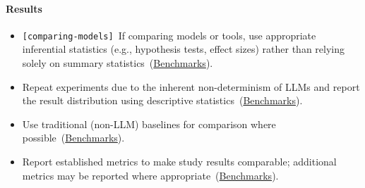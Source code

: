\documentclass[smallextended]{svjour3}
\makeatletter
\newcommand{\must}{\textbf{must}\xspace}
\newcommand{\should}{\textbf{should}\xspace}
\newcommand{\iconM}{\usebox{\iconMbox}\xspace}
\newcommand{\iconS}{\usebox{\iconSbox}\xspace}
\newcommand{\iconM}{●\xspace}
\newcommand{\iconS}{○\xspace}
\newcommand{\condition}[1]{\texttt{\small[#1]}\,}
\newcommand{\condition}[1]{@@cond:#1@@}
\newcommand{\refbenchmarks}{\hyperref[sec:use-suitable-baselines-benchmarks-and-metrics]{Benchmarks}}
\newcommand{\refbenchmarks}{\href{/guidelines/use-suitable-baselines-benchmarks-and-metrics/}{Benchmarks}}
\makeatother
\begin{document}
\begin{appendices}
\paragraph{\textbf{Results}}
\begin{itemize}[label={},leftmargin=*]
    \item \iconM \condition{comparing-models} If comparing models or tools, use appropriate inferential statistics (e.g., hypothesis tests, effect sizes) rather than relying solely on summary statistics~(\refbenchmarks).
    \item \iconS Repeat experiments due to the inherent non-determinism of LLMs and report the result distribution using descriptive statistics~(\refbenchmarks).
    \item \iconS Use traditional (non-LLM) baselines for comparison where possible~(\refbenchmarks).
    \item \iconS Report established metrics to make study results comparable; additional metrics may be reported where appropriate~(\refbenchmarks).
\end{itemize}


\end{appendices}
\end{document}
